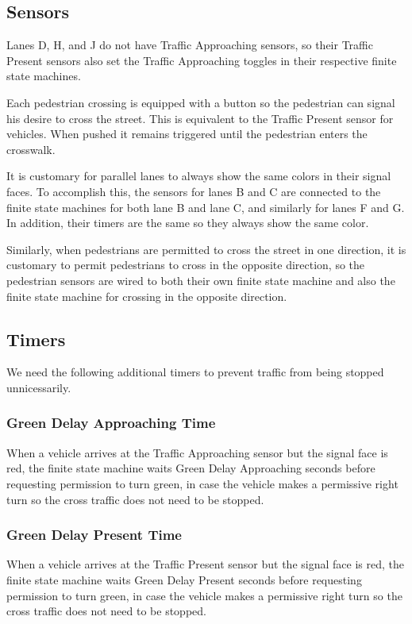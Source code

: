 \documentclass[letterpaper,twoside]{article}
\begin{document}
\subsection{Sensors}

Lanes D, H, and J do not have Traffic Approaching sensors, so their
Traffic Present sensors also set the Traffic Approaching toggles
in their respective finite state machines.

Each pedestrian crossing is equipped with a button so the pedestrian can
signal his desire to cross the street.  This is equivalent to the
Traffic Present sensor for vehicles.  When pushed it remains triggered
until the pedestrian enters the crosswalk.

It is customary for parallel lanes to always show the same colors
in their signal faces.  To accomplish this, the sensors for lanes
B and C are connected to the finite state machines for both lane
B and lane C, and similarly for lanes F and G.  In addition,
their timers are the same so they always show the same color.

Similarly, when pedestrians are permitted to cross the street in one
direction, it is customary to permit pedestrians to cross in the
opposite direction, so the pedestrian sensors are wired to both their
own finite state machine and also the finite state machine for
crossing in the opposite direction.

\subsection{Timers}

We need the following additional timers to prevent traffic from
being stopped unnicessarily.

\subsubsection{Green Delay Approaching Time}
When a vehicle arrives at the Traffic Approaching sensor but the
signal face is red, the finite state machine waits Green Delay
Approaching seconds before requesting permission to turn green,
in case the vehicle makes a permissive right turn so the cross
traffic does not need to be stopped.

\subsubsection{Green Delay Present Time}
When a vehicle arrives at the Traffic Present sensor but the
signal face is red, the finite state machine waits Green Delay
Present seconds before requesting permission to turn green,
in case the vehicle makes a permissive right turn so the cross
traffic does not need to be stopped.
\end{document}
